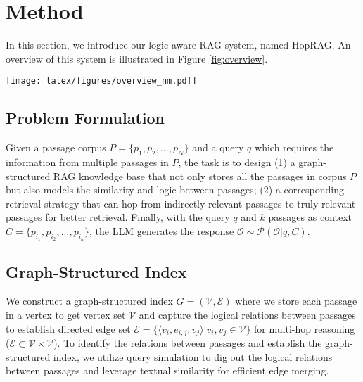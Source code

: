 \section{Method} 
In this section, we introduce our logic-aware RAG system, named HopRAG. An overview of this system is illustrated in Figure \ref{fig:overview}.
\label{sec:method}
\begin{figure*}[htbp!]
\centering
  \texttt{[image: latex/figures/overview\_nm.pdf]}
  \caption{The workflow of HopRAG. \textbf{Left:} At indexing time, we first utilize \textit{Query Simulation} to generate pseudo-queries for each passage and then apply \textit{Edge Merging} to connect passages with directed logical edges. \textbf{Right:} At retrieval time, we employ a \textit{Retrieve-Reason-Prune} pipeline. We first retrieve through purely similarity-based retrieval, then run reasoning-augmented graph traversal to explore the neighborhood, and finally prune the search by a novel metric \textit{Helpfulness} considering both textual similarity and logical importance.}
  \label{fig:overview}
\end{figure*}
\subsection{Problem Formulation}

Given a passage corpus $P=\{p_1, p_2, ..., p_N\}$ and a query $q$ which requires the information from multiple passages in $P$, the task is to design (1) a graph-structured RAG knowledge base that not only stores all the passages in corpus $P$ but also models the similarity and logic between passages; (2) a corresponding retrieval strategy that can hop from indirectly relevant passages to truly relevant passages for better retrieval. Finally, with the query $q$ and $k$ passages as context ${C}=\{p_{i_1},p_{i_2},...,p_{i_k}\}$, the LLM generates the response \(\mathcal{O} \sim \mathcal{P}(\mathcal{O}|q, {C}) \).

\subsection{Graph-Structured Index}
We construct a graph-structured index $G=(\mathcal{V},\mathcal{E})$ where we store each passage in a vertex to get vertex set $\mathcal{V}$ and capture the logical relations between passages to establish directed edge set $\mathcal{E} = \{\langle v_i,e_{i,j},v_j\rangle | v_i,v_j\in \mathcal{V} \}$ for multi-hop reasoning ($\mathcal{E}  \subset \mathcal{V} \times \mathcal{V}$). To identify the relations between passages and establish the graph-structured index, we utilize query simulation to dig out the logical relations between passages and leverage textual similarity for efficient edge merging.

